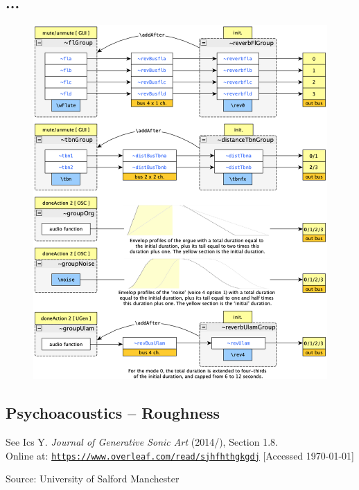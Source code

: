 \documentclass{article}
\begin{document}
\subsection*{...}

\begin{figure}[H]
\centering
\includegraphics[width=\textwidth-1mm]{../img/9940}
\label{struc}
\end{figure}

\newpage
\subsection*{Psychoacoustics -- Roughness}

See Ics Y. \textit{Journal of Generative Sonic Art} (2014/\the\year), Section 1.8.\\ Online at: \href{https://www.overleaf.com/read/sjhfhthgkgdj}{\texttt{\small https://www.overleaf.com/read/sjhfhthgkgdj}} [Accessed \today]

\bigskip

Source:  University of Salford Manchester 
\end{document}
